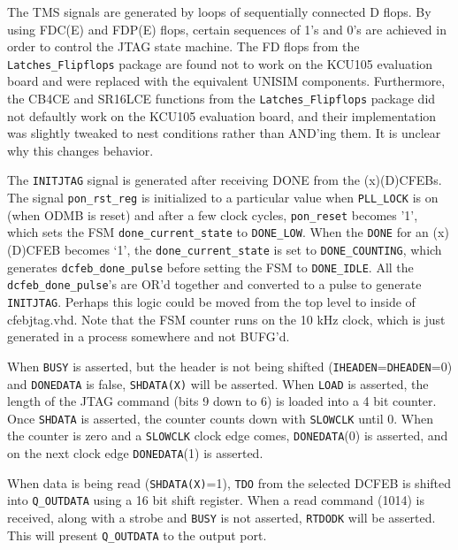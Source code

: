 \documentclass[10pt,a4paper]{article}
\begin{document}
The TMS signals are generated by loops of sequentially connected D flops. By using FDC(E) and FDP(E) flops, certain sequences of 1's and 0's are achieved in order to control the JTAG state machine. The FD flops from the \texttt{Latches\_Flipflops} package are found not to work on the KCU105 evaluation board and were replaced with the equivalent UNISIM components. Furthermore, the CB4CE and SR16LCE functions from the \texttt{Latches\_Flipflops} package did not defaultly work on the KCU105 evaluation board, and their implementation was slightly tweaked to nest conditions rather than AND'ing them. It is unclear why this changes behavior.

The \texttt{INITJTAG} signal is generated after receiving DONE from the (x)(D)CFEBs. The signal \texttt{pon\_rst\_reg} is initialized to a particular value when \texttt{PLL\_LOCK} is on (when ODMB is reset) and after a few clock cycles, \texttt{pon\_reset} becomes '1', which sets the FSM \texttt{done\_current\_state} to \texttt{DONE\_LOW}. When the \texttt{DONE} for an (x)(D)CFEB becomes `1', the \texttt{done\_current\_state} is set to \texttt{DONE\_COUNTING}, which generates \texttt{dcfeb\_done\_pulse} before setting the FSM to \texttt{DONE\_IDLE}. All the \texttt{dcfeb\_done\_pulse}'s are OR'd together and converted to a pulse to generate \texttt{INITJTAG}. Perhaps this logic could be moved from the top level to inside of cfebjtag.vhd. Note that the FSM counter runs on the 10 kHz clock, which is just generated in a process somewhere and not BUFG'd. 

When \texttt{BUSY} is asserted, but the header is not being shifted (\texttt{IHEADEN}=\texttt{DHEADEN}=0) and \texttt{DONEDATA} is false, \texttt{SHDATA(X)} will be asserted. When \texttt{LOAD} is asserted, the length of the JTAG command (bits 9 down to 6) is loaded into a 4 bit counter. Once \texttt{SHDATA} is asserted, the counter counts down with \texttt{SLOWCLK} until 0. When the counter is zero and a \texttt{SLOWCLK} clock edge comes, \texttt{DONEDATA}(0) is asserted, and on the next clock edge \texttt{DONEDATA}(1) is asserted. 

When data is being read (\texttt{SHDATA(X)}=1), \texttt{TDO} from the selected DCFEB is shifted into \texttt{Q\_OUTDATA} using a 16 bit shift register. When a read command (1014) is received, along with a strobe and \texttt{BUSY} is not asserted, \texttt{RTDODK} will be asserted. This will present \texttt{Q\_OUTDATA} to the output port.
\end{document}
